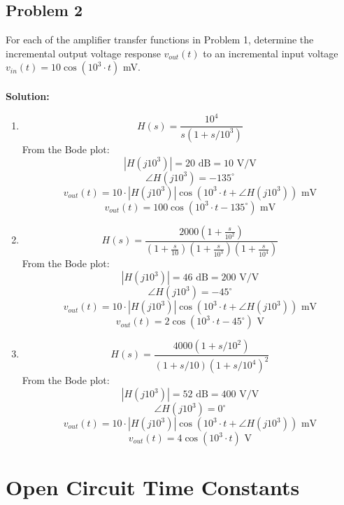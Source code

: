 \documentclass{article}
\begin{document}
\subsection*{Problem 2}
For each of the amplifier transfer functions in Problem 1, determine the incremental output voltage response $v_{out}(t)$ to an incremental input voltage $v_{in}(t) = 10\cos(10^3 \cdot t)$ mV. \\ \\
\textbf{Solution:} \\
\begin{enumerate}[label=\textbf{(\alph*)}]
\item $$H(s) = \frac{10^4}{s(1+s/10^3)}$$
From the Bode plot:
$$|H(j10^3)| = 20\text{ dB} = 10\text{ V/V}$$
$$\angle H(j10^3) = -135^{\circ}$$
$$v_{out}(t) = 10\cdot |H(j10^3)| \cos(10^3 \cdot t + \angle H(j10^3))\text{ mV}$$
$$\boxed{v_{out}(t) = 100 \cos(10^3 \cdot t -135^{\circ})\text{ mV}}$$
\item $$H(s) = \frac{2000\left(1 + \frac{s}{10^2}\right)}{\left(1 + \frac{s}{10}\right)\left(1 + \frac{s}{10^3}\right)\left(1 + \frac{s}{10^4}\right)}$$
From the Bode plot: 
$$|H(j10^3)| = 46\text{ dB} = 200\text{ V/V}$$
$$\angle H(j10^3) = -45^{\circ}$$
$$v_{out}(t) = 10\cdot |H(j10^3)| \cos(10^3 \cdot t + \angle H(j10^3))\text{ mV}$$
$$\boxed{v_{out}(t) = 2 \cos(10^3 \cdot t -45^{\circ})\text{ V}}$$
\item $$H(s) = \frac{4000(1+s/10^2)}{(1+s/10)(1+s/10^4)^2}$$
From the Bode plot: 
$$|H(j10^3)| = 52\text{ dB} = 400\text{ V/V}$$
$$\angle H(j10^3) = 0^{\circ}$$
$$v_{out}(t) = 10\cdot |H(j10^3)| \cos(10^3 \cdot t + \angle H(j10^3))\text{ mV}$$
$$\boxed{v_{out}(t) = 4 \cos(10^3 \cdot t)\text{ V}}$$
\end{enumerate}
\newpage
\section*{Open Circuit Time Constants}
\end{document}
